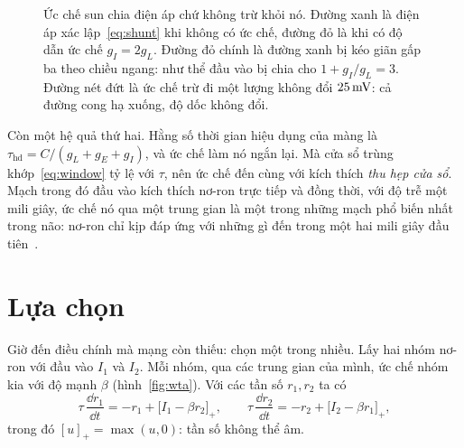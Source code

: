 \begin{figure}[t]
\centering
{}
\caption{Ức chế sun chia điện áp chứ không trừ khỏi nó. Đường xanh là điện áp xác lập~\eqref{eq:shunt} khi không có ức chế, đường đỏ là khi có độ dẫn ức chế $g_I=2g_L$. Đường đỏ chính là đường xanh bị kéo giãn gấp ba theo chiều ngang: như thể đầu vào bị chia cho $1+g_I/g_L=3$. Đường nét đứt là ức chế trừ đi một lượng không đổi $25\,\text{mV}$: cả đường cong hạ xuống, độ dốc không đổi.}
\label{fig:shunt}
\end{figure}

Còn một hệ quả thứ hai. Hằng số thời gian hiệu dụng của màng là $\tau_{\text{hd}}=C/(g_L+g_E+g_I)$, và ức chế làm nó ngắn lại. Mà cửa sổ trùng khớp~\eqref{eq:window} tỷ lệ với $\tau$, nên ức chế đến cùng với kích thích \emph{thu hẹp cửa sổ}. Mạch trong đó đầu vào kích thích nơ-ron trực tiếp và đồng thời, với độ trễ một mili giây, ức chế nó qua một trung gian  là một trong những mạch phổ biến nhất trong não: nơ-ron chỉ kịp đáp ứng với những gì đến trong một hai mili giây đầu tiên~\cite{Pouille2001}.

\section{Lựa chọn}

Giờ đến điều chính mà mạng  còn thiếu: chọn một trong nhiều. Lấy hai nhóm nơ-ron  với đầu vào $I_1$ và $I_2$. Mỗi nhóm, qua các trung gian  của mình, ức chế nhóm kia với độ mạnh $\beta$ (hình~\ref{fig:wta}). Với các tần số $r_1,r_2$ ta có
\begin{equation}
\tau\,\frac{\dd r_1}{\dd t} = -r_1 + \bigl[I_1-\beta r_2\bigr]_+ ,\qquad
\tau\,\frac{\dd r_2}{\dd t} = -r_2 + \bigl[I_2-\beta r_1\bigr]_+ ,
\label{eq:wta}
\end{equation}
trong đó $[u]_+=\max(u,0)$: tần số không thể âm.

